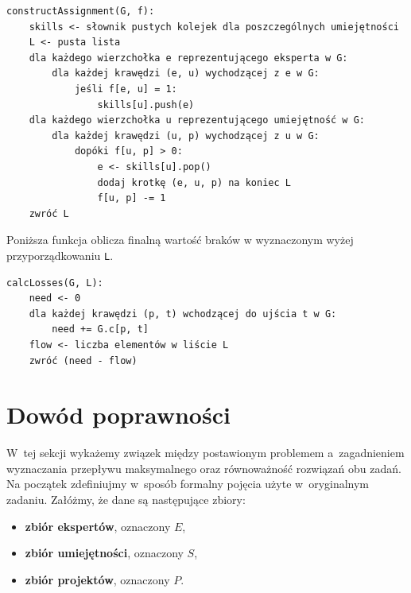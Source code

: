 \documentclass[12pt,a4paper]{article}
\theoremstyle{definition}
\begin{document}
\begin{tcolorbox}[title=Wzynaczanie przydziału]
\begin{verbatim}
constructAssignment(G, f):
    skills <- słownik pustych kolejek dla poszczególnych umiejętności
    L <- pusta lista
    dla każdego wierzchołka e reprezentującego eksperta w G:
        dla każdej krawędzi (e, u) wychodzącej z e w G:
            jeśli f[e, u] = 1:
                skills[u].push(e)
    dla każdego wierzchołka u reprezentującego umiejętność w G:
        dla każdej krawędzi (u, p) wychodzącej z u w G:
            dopóki f[u, p] > 0:
                e <- skills[u].pop()
                dodaj krotkę (e, u, p) na koniec L
                f[u, p] -= 1
    zwróć L
\end{verbatim}
\end{tcolorbox}

\vspace{0.5em}
\noindent
Poniższa funkcja oblicza finalną wartość braków w wyznaczonym wyżej przyporządkowaniu \texttt{L}.\\

\begin{tcolorbox}[title=Wzynaczanie braków]
\begin{verbatim}
calcLosses(G, L):
    need <- 0
    dla każdej krawędzi (p, t) wchodzącej do ujścia t w G:
        need += G.c[p, t]
    flow <- liczba elementów w liście L
    zwróć (need - flow)
\end{verbatim}
\end{tcolorbox}

\section{Dowód poprawności}
\label{sec:correctnessproof}

W~tej sekcji wykażemy związek między postawionym problemem a~zagadnieniem
wyznaczania przepływu maksymalnego oraz równoważność rozwiązań obu zadań.\\

\noindent
Na początek zdefiniujmy w~sposób formalny pojęcia użyte w~oryginalnym zadaniu.
Załóżmy, że dane są następujące zbiory:

\begin{itemize}
	\item \textbf{zbiór ekspertów}, oznaczony $E$,
	\item \textbf{zbiór umiejętności}, oznaczony $S$,
	\item \textbf{zbiór projektów}, oznaczony $P$.
\end{itemize}
\end{document}
